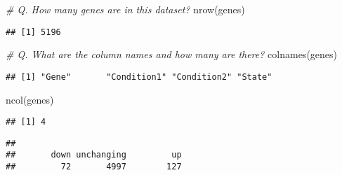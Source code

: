 \documentclass[
]{article}
\newenvironment{Shaded}{\begin{snugshade}}{\end{snugshade}}
\newcommand{\CommentTok}[1]{\textcolor[rgb]{0.56,0.35,0.01}{\textit{#1}}}
\newcommand{\DecValTok}[1]{\textcolor[rgb]{0.00,0.00,0.81}{#1}}
\newcommand{\FunctionTok}[1]{\textcolor[rgb]{0.00,0.00,0.00}{#1}}
\newcommand{\NormalTok}[1]{#1}
\newcommand{\SpecialCharTok}[1]{\textcolor[rgb]{0.00,0.00,0.00}{#1}}
\begin{document}
\begin{Shaded}
\begin{Highlighting}[]
\CommentTok{\# Q. How many genes are in this dataset?}
\FunctionTok{nrow}\NormalTok{(genes)}
\end{Highlighting}
\end{Shaded}

\begin{verbatim}
## [1] 5196
\end{verbatim}

\begin{Shaded}
\begin{Highlighting}[]
\CommentTok{\# Q. What are the column names and how many are there?}
\FunctionTok{colnames}\NormalTok{(genes)}
\end{Highlighting}
\end{Shaded}

\begin{verbatim}
## [1] "Gene"       "Condition1" "Condition2" "State"
\end{verbatim}

\begin{Shaded}
\begin{Highlighting}[]
\FunctionTok{ncol}\NormalTok{(genes)}
\end{Highlighting}
\end{Shaded}

\begin{verbatim}
## [1] 4
\end{verbatim}

\begin{Shaded}
\end{Shaded}

\begin{verbatim}
## 
##       down unchanging         up 
##         72       4997        127
\end{verbatim}

\begin{Shaded}
\end{Shaded}
\end{document}
